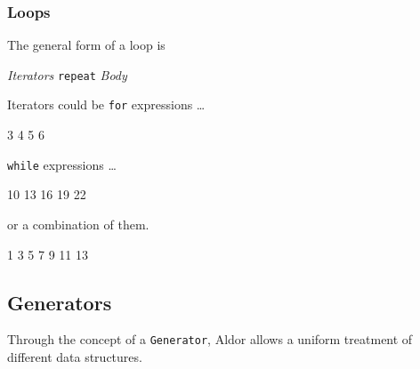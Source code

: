 \begin{frame}[fragile]
  \frametitle<presentation>{Loops}

The general form of a loop is
\begin{center}
  \textit{Iterators} \texttt{repeat} \textit{Body}
\end{center}
Iterators could be \texttt{for} expressions \ldots
\begin{myverbatim}
3 4 5 6
\end{myverbatim}
\texttt{while} expressions \ldots
\begin{myverbatim}
10 13 16 19 22
\end{myverbatim}
or a combination of them.
\end{frame}
\begin{myverbatim}
1 3 5 7 9 11 13
\end{myverbatim}
\begin{comment}
<<Collections>>=
aldor -gloop
macro I == MachineInteger;
import from I, List I;
for i in 3..6 repeat stdout << i << space
k := 7; while k < 20 repeat {k := k+3; stdout << k << space}
for i in 1..20 | odd? i while i < 15 repeat stdout << i << space
#quit
@
\end{comment}

































\subsection{Generators}

Through the concept of a \texttt{Generator}, Aldor allows a uniform
treatment of different data structures.
\begin{myverbatim}
\end{myverbatim}

